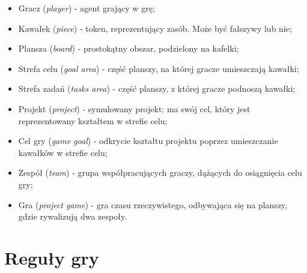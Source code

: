 \documentclass[a4paper]{article}
\begin{document}
\begin{itemize}
\item
  Gracz (\emph{player}) - agent grający w grę;
\item
  Kawałek (\emph{piece}) - token, reprezentujący zasób. Może być fałszywy lub nie;
\item
  Plansza (\emph{board}) - prostokątny obszar, podzielony na kafelki;
\item
  Strefa celu (\emph{goal area}) - część planszy, na której gracze umieszczają kawałki;
\item
  Strefa zadań (\emph{tasks area}) - część planszy, z której gracze podnoszą kawałki;
\item
  Projekt (\emph{project}) - symulowany projekt; ma swój cel, który jest reprezentowany kształtem w strefie celu;
\item
  Cel gry (\emph{game goal}) - odkrycie kształtu projektu poprzez umieszczanie kawałków w strefie celu;
\item
  Zespół (\emph{team}) - grupa współpracujących graczy, dążących do osiągnięcia celu gry;
\item
  Gra (\emph{project game}) - gra czasu rzeczywistego, odbywająca się na planszy, gdzie rywalizują dwa zespoły.
\end{itemize}

\section{Reguły gry}
\end{document}
